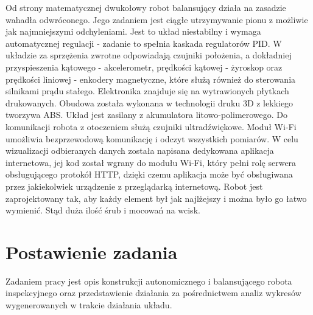 \documentclass[a4paper,12pt,twoside,openany]{report}
\begin{document}
Od strony matematycznej dwukołowy robot balansujący działa na zasadzie wahadła odwróconego. Jego zadaniem jest ciągłe utrzymywanie pionu z możliwie jak najmniejszymi odchyleniami. Jest to układ niestabilny i wymaga automatycznej regulacji - zadanie to spełnia kaskada regulatorów PID. W układzie za sprzężenia zwrotne odpowiadają czujniki położenia, a dokładniej przyspieszenia kątowego - akcelerometr, prędkości kątowej - żyroskop oraz prędkości liniowej - enkodery magnetyczne, które służą również do sterowania silnikami prądu stałego. Elektronika znajduje się na wytrawionych płytkach drukowanych. Obudowa została wykonana w technologii druku 3D z lekkiego tworzywa ABS. Układ jest zasilany z akumulatora litowo-polimerowego. Do komunikacji robota z otoczeniem służą czujniki ultradźwiękowe. Moduł Wi-Fi umożliwia bezprzewodową komunikację i odczyt wszystkich pomiarów. W celu wizualizacji odbieranych danych została napisana dedykowana aplikacja internetowa, jej kod został wgrany do modułu Wi-Fi, który pełni rolę serwera obsługującego protokół HTTP, dzięki czemu aplikacja może być obsługiwana przez jakiekolwiek urządzenie z przeglądarką internetową. Robot jest zaprojektowany tak, aby każdy element był jak najlżejszy i można było go łatwo wymienić. Stąd duża ilość śrub i mocowań na wcisk.

\section{Postawienie zadania}

Zadaniem pracy jest opis konstrukcji autonomicznego i balansującego robota inspekcyjnego oraz przedstawienie działania za pośrednictwem analiz wykresów wygenerowanych w trakcie działania układu.
\end{document}
